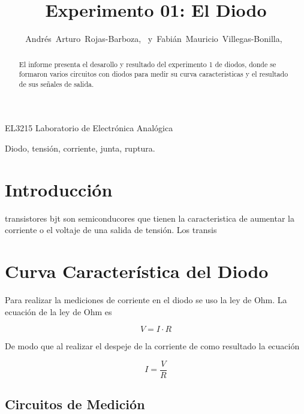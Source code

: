 \documentclass[journal]{IEEEtran}
\begin{document}
\title{Experimento 01: El Diodo}


\author{Andrés~Arturo~Rojas-Barboza,~
        y~Fabián~Mauricio~Villegas-Bonilla,~
}


%
{EL3215 Laboratorio de Electrónica Analógica}


\maketitle


\begin{abstract}
El informe presenta el desarollo y resultado del experimento 1 de diodos, donde se formaron varios circuitos con diodos para medir su curva caracteristicas y el resultado de sus señales de salida.
\end{abstract}

\begin{IEEEkeywords}
Diodo, tensión, corriente, junta, ruptura.
\end{IEEEkeywords}


\section{Introducción}

 transistores bjt son semiconducores que tienen la caracteristica de aumentar la corriente o el voltaje de una salida de tensión. Los transis


\section{Curva Característica del Diodo}
Para realizar la mediciones de corriente en el diodo se uso la ley de Ohm. La ecuación de la ley de Ohm es
\par
\begin{equation}
V=I\cdot R
\end{equation}


De modo que al realizar el despeje de la corriente de como resultado la ecuación

\begin{equation}
I=\frac{V}{R}
\end{equation}

\subsection{Circuitos de Medición}
\end{document}
